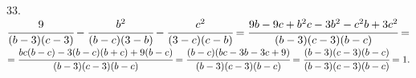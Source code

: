 33. $\cfrac{9}{(b-3)(c-3)}-\cfrac{b^2}{(b-c)(3-b)}-\cfrac{c^2}{(3-c)(c-b)}=\cfrac{9b-9c+b^2c-3b^2-c^2b+3c^2}{(b-3)(c-3)(b-c)}=$\\$=
\cfrac{bc(b-c)-3(b-c)(b+c)+9(b-c)}{(b-3)(c-3)(b-c)}=\cfrac{(b-c)(bc-3b-3c+9)}{(b-3)(c-3)(b-c)}=\cfrac{(b-3)(c-3)(b-c)}{(b-3)(c-3)(b-c)}=1.$\\
